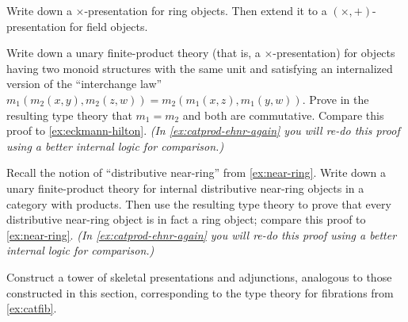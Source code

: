 \begin{ex}\label{ex:catprodcoprod-field}
  Write down a $\times$-presentation for ring objects.
  Then extend it to a $(\times,+)$-presentation for field objects.
\end{ex}

\begin{ex}\label{ex:catprod-eckmann-hilton}
  Write down a unary finite-product theory (that is, a $\times$-presentation) for objects having two monoid structures with the same unit and satisfying an internalized version of the ``interchange law'' $m_1(m_2(x,y),m_2(z,w)) = m_2(m_1(x,z),m_1(y,w))$.
  Prove in the resulting type theory that $m_1=m_2$ and both are commutative.
  Compare this proof to \cref{ex:eckmann-hilton}.
  \textit{(In \cref{ex:catprod-ehnr-again} you will re-do this proof using a better internal logic for comparison.)}
\end{ex}

\begin{ex}\label{ex:catprod-nearring}
  Recall the notion of ``distributive near-ring'' from \cref{ex:near-ring}.
  Write down a unary finite-product theory for internal distributive near-ring objects in a category with products.
  Then use the resulting type theory to prove that every distributive near-ring object is in fact a ring object; compare this proof to \cref{ex:near-ring}.
  \textit{(In \cref{ex:catprod-ehnr-again} you will re-do this proof using a better internal logic for comparison.)}
\end{ex}

\begin{ex}\label{ex:catfib-thy}
  Construct a tower of skeletal presentations and adjunctions, analogous to those constructed in this section, corresponding to the type theory for fibrations from \cref{ex:catfib}.
\end{ex}

\ChapterExercises



